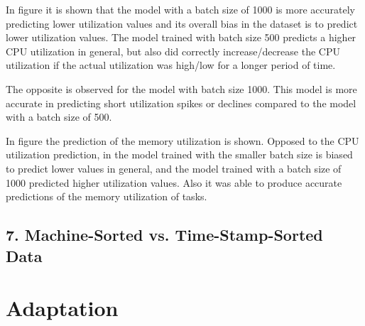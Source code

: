   


  In figure 
   it is shown that the model with a batch size of 1000 is more accurately predicting lower utilization values and its overall bias in the dataset is to predict lower utilization values.
  The model trained with batch size 500 predicts a higher CPU utilization in general, but also did correctly increase/decrease the CPU utilization if the actual utilization was high/low for a longer period of time.

  The opposite is observed for the model with batch size 1000. 
  This model is more accurate in predicting short utilization spikes or declines compared to the model with a batch size of 500.
  


  In figure 
  the prediction of the memory utilization is shown.
  Opposed to the CPU utilization prediction, in the model trained with the smaller batch size is biased to predict lower values in general, and the model trained with a batch size of 1000 predicted higher utilization values. Also it was able to produce accurate predictions of the memory utilization of tasks.
  \subsection{7. Machine-Sorted vs. Time-Stamp-Sorted Data}
  \label{sec:machine-sorted-vs-time-stamp-sorted-data-evaluation-scenarios}

    



\section{Adaptation}
